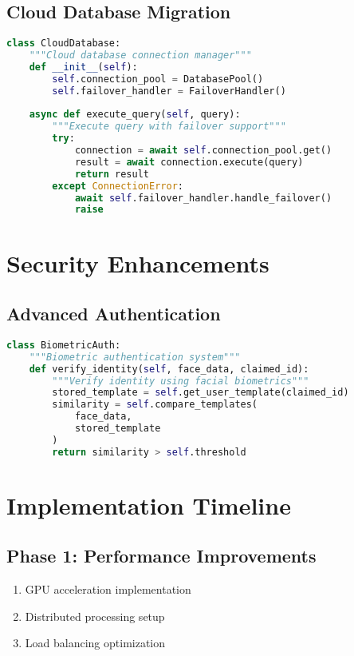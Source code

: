 \subsection{Cloud Database Migration}
\begin{lstlisting}[language=Python]
class CloudDatabase:
    """Cloud database connection manager"""
    def __init__(self):
        self.connection_pool = DatabasePool()
        self.failover_handler = FailoverHandler()
        
    async def execute_query(self, query):
        """Execute query with failover support"""
        try:
            connection = await self.connection_pool.get()
            result = await connection.execute(query)
            return result
        except ConnectionError:
            await self.failover_handler.handle_failover()
            raise
\end{lstlisting}

\section{Security Enhancements}

\subsection{Advanced Authentication}
\begin{lstlisting}[language=Python]
class BiometricAuth:
    """Biometric authentication system"""
    def verify_identity(self, face_data, claimed_id):
        """Verify identity using facial biometrics"""
        stored_template = self.get_user_template(claimed_id)
        similarity = self.compare_templates(
            face_data,
            stored_template
        )
        return similarity > self.threshold
\end{lstlisting}

\section{Implementation Timeline}

\subsection{Phase 1: Performance Improvements}
\begin{enumerate}
    \item GPU acceleration implementation
    \item Distributed processing setup
    \item Load balancing optimization
\end{enumerate}

